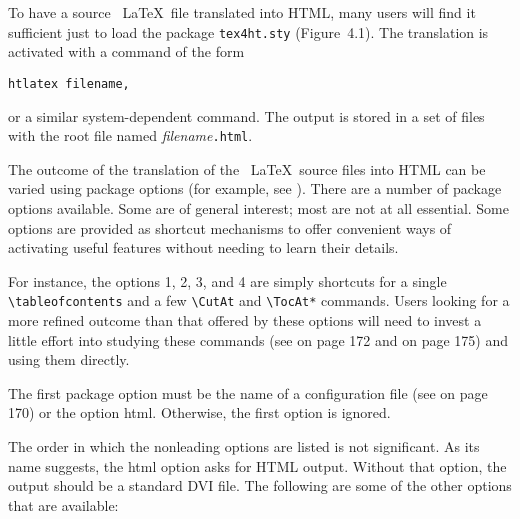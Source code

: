 

To have a source \ \LaTeX\  file translated into HTML, many users will
find it sufficient just to load the \texht package \verb|tex4ht.sty| (Figure~4.1). 
The translation is activated with a command of the form 

\begin{verbatim}
htlatex filename, 
\end{verbatim}

or a similar system-dependent command. The output is stored in a set of
files with the root file named \hbox{\emph{filename}\verb|.html|}.


The outcome of the translation of the \ \LaTeX\  source files into HTML
can be varied using package options (for example, see ).
There are a number of package options available. Some are of general
interest; most are not at all essential. Some options are provided as
shortcut mechanisms to offer convenient ways of activating useful
features without needing to learn their details. 


For instance, the options 1, 2, 3, and 4 are simply shortcuts for a
single \verb|\tableofcontents| and a few \verb|\CutAt| and
\verb|\TocAt*| commands. Users looking for a more refined outcome than
that offered by these options will need to invest a little effort into
studying these commands (see  on page 172 and 
on page 175) and using them directly. 

The first package option must be the name of a configuration file (see
 on page 170) or the option html. Otherwise, the first
option is ignored. 

The order in which the nonleading options are listed is not significant.
As its name suggests, the html option asks for HTML output. Without that
option, the output should be a standard DVI file. The following are some
of the other options that are available: 


